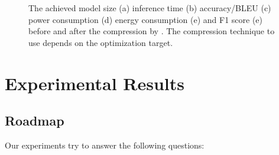\begin{figure}[!t]
\centering
{}
\hfill
{}
\hfill
{}
\hfill
{}
\hfill
{}
\hfill

\caption{The achieved model size (a) inference time (b) accuracy/BLEU (c) power consumption (d) 
energy consumption (e) and F1 score (e) before and after the compression by \pruning.
The compression technique to use depends on the optimization target.}
\label{fig:analy_prun}
\end{figure}

\section{Experimental Results}


\subsection{Roadmap}
Our experiments try to answer the following questions:

